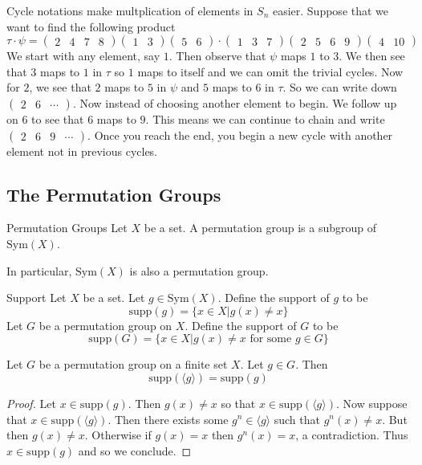 \documentclass[a4paper]{article}
\begin{document}
Cycle notations make multplication of elements in $S_n$ easier. Suppose that we want to find the following product $$\tau\cdot\psi=\begin{pmatrix}2&4&7&8\end{pmatrix}\begin{pmatrix}1&3\end{pmatrix}\begin{pmatrix}5&6\end{pmatrix}\cdot\begin{pmatrix}1 & 3 & 7\end{pmatrix}\begin{pmatrix}2&5&6&9\end{pmatrix}\begin{pmatrix}4&10\end{pmatrix}$$
We start with any element, say $1$. Then observe that $\psi$ maps $1$ to $3$. We then see that $3$ maps to $1$ in $\tau$ so $1$ maps to itself and we can omit the trivial cycles. Now for $2$, we see that $2$ maps to $5$ in $\psi$ and $5$ maps to $6$ in $\tau$. So we can write down $\begin{pmatrix}2&6&\cdots\end{pmatrix}$. Now instead of choosing another element to begin. We follow up on $6$ to see that $6$ maps to $9$. This means we can continue to chain and write $\begin{pmatrix}2&6&9&\cdots\end{pmatrix}$. Once you reach the end, you begin a new cycle with another element not in previous cycles. 

\subsection{The Permutation Groups}
\begin{defn}{Permutation Groups}{} Let $X$ be a set. A permutation group is a subgroup of $\text{Sym}(X)$. 
\end{defn}

In particular, $\text{Sym}(X)$ is also a permutation group. 

\begin{defn}{Support}{} Let $X$ be a set. Let $g\in\text{Sym}(X)$. Define the support of $g$ to be $$\text{supp}(g)=\{x\in X|g(x)\neq x\}$$ Let $G$ be a permutation group on $X$. Define the support of $G$ to be $$\text{supp}(G)=\{x\in X|g(x)\neq x\text{ for some }g\in G\}$$
\end{defn}

\begin{lmm}{}{} Let $G$ be a permutation group on a finite set $X$. Let $g\in G$. Then $$\text{supp}(\langle g\rangle)=\text{supp}(g)$$ \tcbline
\begin{proof}
Let $x\in\text{supp}(g)$. Then $g(x)\neq x$ so that $x\in\text{supp}(\langle g\rangle)$. Now suppose that $x\in\text{supp}(\langle g\rangle)$. Then there exists some $g^n\in\langle g\rangle$ such that $g^n(x)\neq x$. But then $g(x)\neq x$. Otherwise if $g(x)=x$ then $g^n(x)=x$, a contradiction. Thus $x\in\text{supp}(g)$ and so we conclude. 
\end{proof}
\end{lmm}
\end{document}
